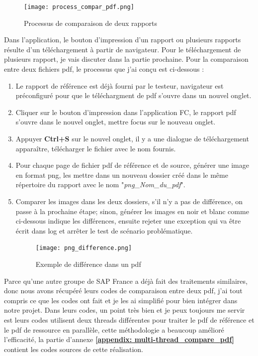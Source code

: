     \begin{figure}[H]
        \centering
        \texttt{[image: process\_compar\_pdf.png]}
        \caption{Processus de comparaison de deux rapports}
        \label{fig:proc_compar_report_label}
    \end{figure}
    Dans l'application, le bouton d'impression d'un rapport ou plusieurs rapports résulte d'un téléchargement à partir de navigateur. Pour le téléchargement de plusieurs rapport, je vais discuter dans la partie prochaine. Pour la comparaison entre deux fichiers pdf, le processus que j'ai conçu est ci-dessous : 
    \begin{enumerate}[label=\arabic*)]
        \item Le rapport de référence est déjà fourni par le testeur, navigateur est préconfiguré pour que le téléchargment de pdf s'ouvre dans un nouvel onglet.
        \item Cliquer sur le bouton d'impression dans l'application FC, le rapport pdf s'ouvre dans le nouvel onglet, mettre focus sur le nouveau onglet.
        \item Appuyer \textbf{Ctrl+S} sur le nouvel onglet, il y a une dialogue de téléchargement apparaître, télécharger le fichier avec le nom fournis.
        \item Pour chaque page de fichier pdf de référence et de source, générer une image en format png, les mettre dans un nouveau dossier créé dans le même répertoire du rapport avec le nom "\textit{png\_Nom\_du\_pdf}".
        \item Comparer les images dans les deux dossiers, s'il n'y a pas de différence, on passe à la prochaine étape; sinon, générer les images en noir et blanc comme ci-dessous indique les différences, ensuite rejeter une exception qui va être écrit dans log et arrêter le test de scénario problématique.
        \begin{figure}[H]
            \centering
            \texttt{[image: png\_difference.png]}
            \caption{Exemple de différence dans un pdf}
            \label{fig:exemple_pdf_diff_label}
        \end{figure}
    \end{enumerate}
    
    Parce qu'une autre groupe de SAP France a déjà fait des traitements similaires, donc nous avons récupéré leurs codes de comparaison entre deux pdf, j'ai tout compris ce que les codes ont fait et je les ai simplifié pour bien intégrer dans notre projet. Dans leurs codes, un point très bien et je peux toujours me servir est leurs codes utilisent deux threads différentes pour traiter le pdf de référence et le pdf de ressource en parallèle, cette méthodologie a beaucoup amélioré l'efficacité, la partie d'annexe \textbf{\ref{appendix: multi-thread_compare_pdf}} contient les codes sources de cette réalisation. 
    
